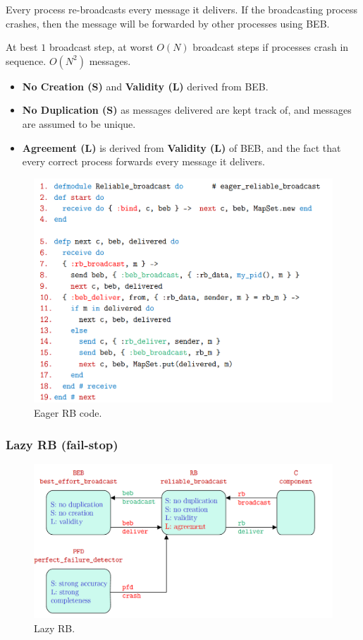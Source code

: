 \documentclass[11pt]{article}
\begin{document}
Every process re-broadcasts every message it delivers.
If the broadcasting process crashes, then the message will be forwarded by other processes using BEB.

At best $1$ broadcast step, at worst $O(N)$ broadcast steps if processes crash in sequence.
$O(N^2)$ messages.

\begin{itemize}
  \item \textbf{No Creation (S)} and \textbf{Validity (L)} derived from BEB.
  \item \textbf{No Duplication (S)} as messages delivered are kept track of, and messages are assumed to be unique.
  \item \textbf{Agreement (L)} is derived from \textbf{Validity (L)} of BEB, and the fact that every correct process forwards every message it delivers.
\end{itemize}

\begin{figure}[htb!]
  \centering
  \caption{Eager RB code.}
  \includegraphics[scale=0.3]{eagercode}
\end{figure}

\subsubsection{Lazy RB (fail-stop)}
\begin{figure}[htb!]
  \centering
  \caption{Lazy RB.}
  \includegraphics[scale=0.3]{lazyrb}
\end{figure}
\end{document}
